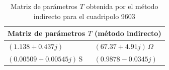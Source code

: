\begin{table}[H]
\centering
\begin{tabular}{|l|l|}
\hline
\multicolumn{2}{|c|}{\textbf{Matriz de parámetros $T$ (método indirecto)}} \\ \hline
$(1.138 + 0.437j)$ & $(67.37 + 4.91j)\,\Omega$ \\ \hline
$(0.00509 + 0.00545j)\,\mathrm{S}$ & $(0.9878 - 0.0345j)$ \\ \hline
\end{tabular}
\caption{Matriz de parámetros $T$ obtenida por el método indirecto para el cuadripolo 9603}
\label{tab:matriz_T9603_indirecta}
\end{table}
	
